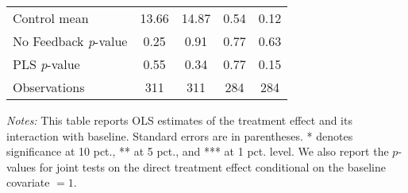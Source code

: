 \begin{table}[ht]
{\begin{threeparttable}
\begin{tabular}{l*{4}{c}}
Control mean    &    13.66         &    14.87         &     0.54         &     0.12         \\
No Feedback \emph{p}-value&     0.25         &     0.91         &     0.77         &     0.63         \\
PLS \emph{p}-value&     0.55         &     0.34         &     0.77         &     0.15         \\
Observations    &      311         &      311         &      284         &      284         \\
\bottomrule \end{tabular} \begin{tablenotes}[flushleft] \footnotesize \item \emph{Notes:} This table reports OLS estimates of the treatment effect and its interaction with baseline. Standard errors are in parentheses. * denotes significance at 10 pct., ** at 5 pct., and *** at 1 pct. level. We also report the \(p\)-values for joint tests on the direct treatment effect conditional on the baseline covariate $= 1$. \end{tablenotes} \end{threeparttable} } \end{table}

